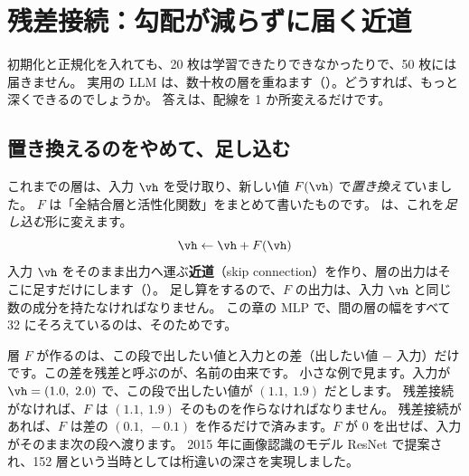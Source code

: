 \section{残差接続：勾配が減らずに届く近道}\label{sec:training-residual}

初期化と正規化を入れても、20 枚は学習できたりできなかったりで、50 枚には届きません。
実用の LLM は、数十枚の層を重ねます（）。どうすれば、もっと深くできるのでしょうか。
答えは、配線を 1 か所変えるだけです。

\subsection*{置き換えるのをやめて、足し込む}

これまでの層は、入力 $\vh$ を受け取り、新しい値 $F(\vh)$ で\emph{置き換えて}いました。
$F$ は「全結合層と活性化関数」をまとめて書いたものです。
は、これを\emph{足し込む}形に変えます。
\begin{equation}
\vh\leftarrow\vh+F(\vh)
\label{eq:training-residual}
\end{equation}
入力 $\vh$ をそのまま出力へ運ぶ\textbf{近道}（skip connection）を作り、層の出力はそこに足すだけにします（）。
足し算をするので、$F$ の出力は、入力 $\vh$ と同じ数の成分を持たなければなりません。
この章の MLP で、間の層の幅をすべて 32 にそろえているのは、そのためです。

層 $F$ が作るのは、この段で出したい値と入力との差（出したい値 $-$ 入力）だけです。この差を残差と呼ぶのが、名前の由来です。
小さな例で見ます。入力が $\vh=(1.0,\ 2.0)$ で、この段で出したい値が $(1.1,\ 1.9)$ だとします。
残差接続がなければ、$F$ は $(1.1,\ 1.9)$ そのものを作らなければなりません。
残差接続があれば、$F$ は差の $(0.1,\ -0.1)$ を作るだけで済みます。$F$ が 0 を出せば、入力がそのまま次の段へ渡ります。
2015 年に画像認識のモデル ResNet で提案され、152 層という当時としては桁違いの深さを実現しました\cite{he2016deep}。

